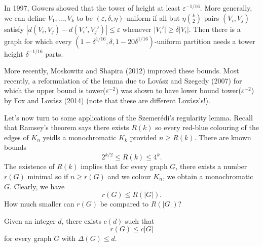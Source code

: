 \documentclass[a4paper]{article}
\begin{document}
In 1997, Gowers showed that the tower of height at least $\varepsilon^{-1/16}$. More generally, we can define $V_1, \ldots, V_k$ to be $(\varepsilon, \delta, \eta)$-uniform if all but $\eta \binom{k}{2}$ pairs $(V_i, V_j)$ satisfy $|d(V_i, V_j) - d(V_i', V_j')| \leq \varepsilon$ whenever $|V_i'| \geq \delta |V_i|$. Then there is a graph for which every $(1 - \delta^{1/16}, \delta, 1 - 20 \delta^{1/16})$-uniform partition needs a tower height $\delta^{-1/16}$ parts.

More recently, Moskowitz and Shapira (2012) improved these bounds. Most recently, a reformulation of the lemma due to Lov\'asz and Szegedy (2007) for which the upper bound is tower($\varepsilon^{-2}$) was shown to have lower bound tower($\varepsilon^{-2}$) by Fox and Lov\'asz (2014) (note that these are different Lov\'asz's!).

Let's now turn to some applications of the Szemer\'edi's regularity lemma. Recall that Ramsey's theorem says there exists $R(k)$ so every red-blue colouring of the edges of $K_n$ yeidls a monochromatic $K_k$ provided $n \geq R(k)$. There are known bounds
\[
  2^{k/2} \leq R(k) \leq 4^k.
\]
The existence of $R(k)$ implies that for every graph $G$, there exists a number $r(G)$ minimal so if $n \geq r(G)$ and we colour $K_n$, we obtain a monochromatic $G$. Clearly, we have
\[
  r(G) \leq R(|G|).
\]
How much smaller can $r(G)$ be compared to $R(|G|)$?

\begin{thm}
  Given an integer $d$, there exists $c(d)$ such that
  \[
    r(G) \leq c|G|
  \]
  for every graph $G$ with $\Delta(G) \leq d$.
\end{thm}
\end{document}
